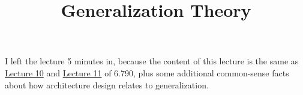 \title{Generalization Theory}



I left the lecture 5 minutes in,
because the content of this lecture
is the same as \href{/6.790/lectures/10}{Lecture 10}
and \href{/6.790/lectures/11}{Lecture 11} of 6.790,
plus some additional common-sense facts
about how architecture design relates to generalization.

